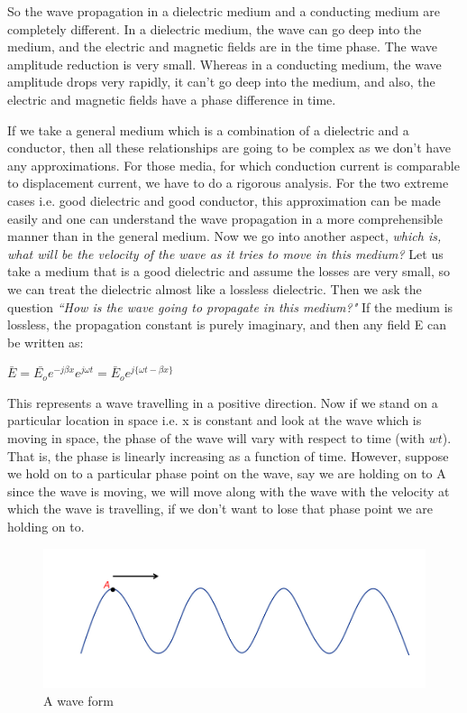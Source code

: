 So the wave propagation in a dielectric medium and a conducting medium are completely different. In a dielectric medium, the wave can go deep into the medium, and the electric and magnetic fields are in the time phase. The wave amplitude reduction is very small. Whereas in a conducting medium, the wave amplitude drops very rapidly, it can't go deep into the medium, and also, the electric and magnetic fields have a phase difference in time.

If we take a general medium which is a combination of a dielectric and a conductor, then all these relationships are going to be complex as we don't have any approximations. For those media, for which conduction current is comparable to displacement current, we have to do a rigorous analysis. For the two extreme cases i.e. good dielectric and good conductor, this approximation can be made easily and one can understand the wave propagation in a more comprehensible manner than in the general medium.
Now we go into another aspect, \emph{which is, what will be the velocity of the wave as it tries to move in this medium?} Let us take a medium that is a good dielectric and assume the losses are very small, so we can treat the dielectric almost like a lossless dielectric. Then we ask the question \emph{``How is the wave going to propagate in this medium?"} If the medium is lossless, the propagation constant is purely imaginary, and then any field E can be written as:
\begin{center}
$\bar{E}=\bar{E_{o}}e^{-j\beta x}e^{j\omega t}=\bar{E}_{o}e^{j\{\omega t-\beta x\}} $
\end{center}

This represents a wave travelling in a positive direction. Now if we stand on a particular location in space i.e. x is constant and look at the wave which is moving in space, the phase of the wave will vary with respect to time (with $wt$). That is, the phase is linearly increasing as a function of time. However, suppose we hold on to a particular phase point on the wave, say we are holding on to A since the wave is moving, we will move along with the wave with the velocity at which the wave is travelling, if we don't want to lose that phase point we are holding on to.
\begin{figure}[h]
\centering
\includegraphics[width=1\linewidth]{./graphics/constant_phase}
\caption{A wave form}
\end{figure}

